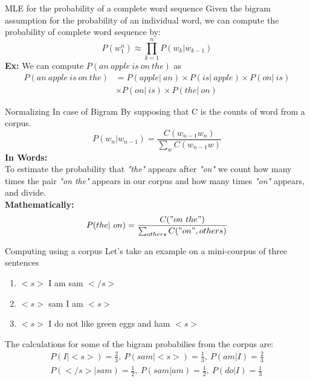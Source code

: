 \documentclass{beamer}
\begin{document}
\begin{frame}{MLE for the probability of a complete word sequence}
    Given the bigram assumption for the probability of an individual word, we can compute the probability of complete word sequence by:
    $$P(w_1^n) \approx \prod_{k=1}^nP(w_k|w_{k-1})$$
    \textbf{Ex:} We can compute $P(an\ apple\ is\ on\ the)$ as
    \begin{align*}
        P(an\ apple\ is\ on\ the) &= P(apple|\ an) \times P(is|\ apple) \times P(on|\ is)\\
                                  &\times P(on|\ is) \times P(the|\ on)
    \end{align*}

\end{frame}

\begin{frame}{Normalizing In case of Bigram}
By supposing that C is the counts of word from a corpus.
    $$P(w_n|w_{n-1}) = \frac{C(w_{n-1}w_n)}{\sum_{w}C(w_{n-1}w)}$$
    \textbf{In Words:}\\
    To estimate the probability that \textit{"the"} appears after \textit{"on"} we count how many times the pair \textit{"on the"} appears in our corpus and how many times \textit{"on"} appears, and divide.\\
    \textbf{Mathematically:}\\
    $$P(the|\ on) = \frac{C("on\ the")}{\sum_{others}C("on",others)}$$
\end{frame}

\begin{frame}{Computing using a corpus}
    Let's take an example on a mini-courpus of three sentences\\
    \begin{enumerate}
        \item $<s>$ I am sam $</s>$
        \item $<s>$ sam I am $<s>$
        \item  $<s>$ I do not like green eggs and ham $<s>$
    \end{enumerate}
    The calculations for some of the bigram probabilies from the corpus are:
    \begin{align*}
        P(I|<s>)=\frac{2}{3},\ P(sam|<s>)=\frac{1}{3},\ P(am|I)=\frac{2}{3}\\
        P(</s>|sam)=\frac{1}{2},\ P(sam|am)=\frac{1}{2},\ P(do|I)=\frac{1}{3}
    \end{align*}
\end{frame}
\end{document}
